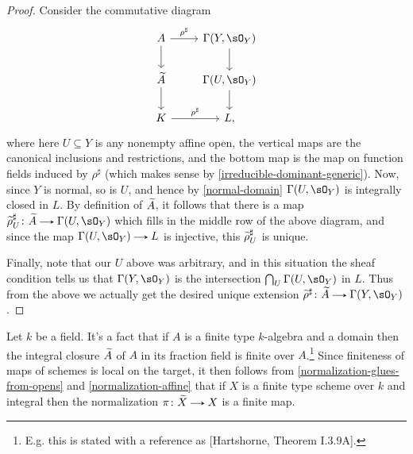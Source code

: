 \begin{nothing}
\begin{subproposition}
\begin{proof}
      Consider the commutative diagram
      \[
        \begin{tikzcd}
          A \ar[r, "\rho^\sharp"] \ar[d] &
          \Gamma(Y,\sO_Y) \ar[d] \\
          \til{A} \ar[d] &
          \Gamma(U, \sO_Y) \ar[d] \\
          K \ar[r, "\rho^\sharp"] &
          L,
        \end{tikzcd}
      \]
       where here $U \subseteq Y$ is any nonempty affine open, the vertical maps are the canonical inclusions and restrictions, and the bottom map is the map on function fields induced by $\rho^\sharp$ (which makes sense by \cref{irreducible-dominant-generic}). Now, since $Y$ is normal, so is $U$, and hence by \cref{normal-domain} $\Gamma(U,\sO_Y)$ is integrally closed in $L$. By definition of $\widetilde{A}$, it follows that there is a map $\til{\rho}^\sharp_U \c \til{A} \to \Gamma(U,\sO_Y)$ which fills in the middle row of the above diagram, and since the map $\Gamma(U,\sO_Y) \to L$ is injective, this $\widetilde{\rho}^\sharp_U$ is unique.

       Finally, note that our $U$ above was arbitrary, and in this situation the sheaf condition tells us that $\Gamma(Y,\sO_Y)$ is the intersection $\bigcap_U \Gamma(U,\sO_Y)$ in $L$. Thus from the above we actually get the desired unique extension $\til{\rho}^\sharp \c \til{A} \to \Gamma(Y,\sO_Y)$.
    \end{proof}
  \end{subproposition}
\end{nothing}

\begin{remark}
  \label{normalization-finite}
  Let $k$ be a field. It's a fact that if $A$ is a finite type $k$-algebra and a domain then the integral closure $\widetilde{A}$ of $A$ in its fraction field is finite over $A$.\footnote{E.g. this is stated with a reference as [Hartshorne, Theorem I.3.9A].} Since finiteness of maps of schemes is local on the target, it then follows from \cref{normalization-glues-from-opens} and \cref{normalization-affine} that if $X$ is a finite type scheme over $k$ and integral then the normalization $\pi \c \til{X} \to X$ is a finite map.
\end{remark}



